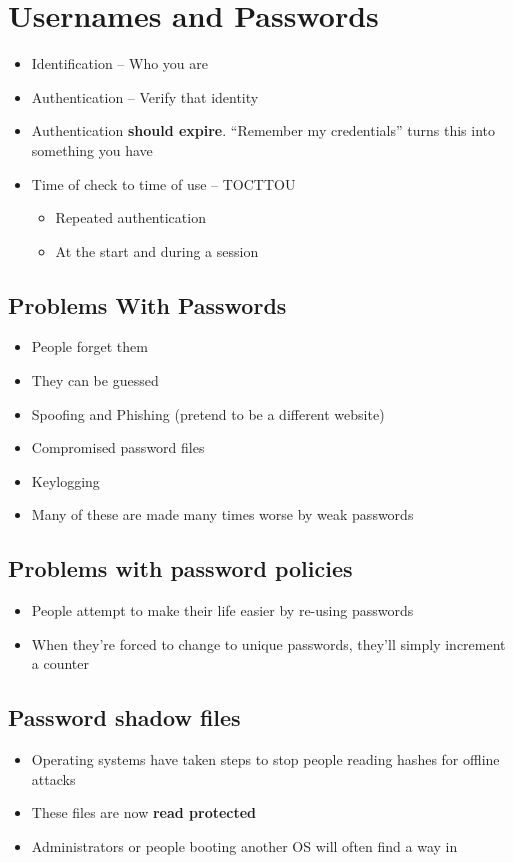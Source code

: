 \documentclass{article}
\begin{document}
\tableofcontents

\newpage

\section{Usernames and Passwords}
\begin{itemize}
  \item Identification – Who you are 
  \item Authentication – Verify that identity 
  \item Authentication \textbf{should expire}. “Remember my credentials” turns this into something you have 
  \item Time of check to time of use – TOCTTOU 
  \begin{itemize}
    \item Repeated authentication 
    \item At the start and during a session
  \end{itemize}
\end{itemize}

\subsection{Problems With Passwords}
\begin{itemize}
  \item People forget them 
  \item They can be guessed
  \item Spoofing and Phishing (pretend to be a different website)
  \item Compromised password files 
  \item Keylogging 
  \item Many of these are made many times worse by weak passwords
\end{itemize}

\subsection{Problems with password policies}
\begin{itemize}
  \item People attempt to make their life easier by re-using passwords 
  \item When they’re forced to change to unique passwords, they’ll simply increment a counter
\end{itemize}

\subsection{Password shadow files}
\begin{itemize}
  \item Operating systems have taken steps to stop people reading hashes for offline attacks 
  \item These files are now \textbf{read protected }
  \item Administrators or people booting another OS will often find a way in
\end{itemize}
\end{document}
